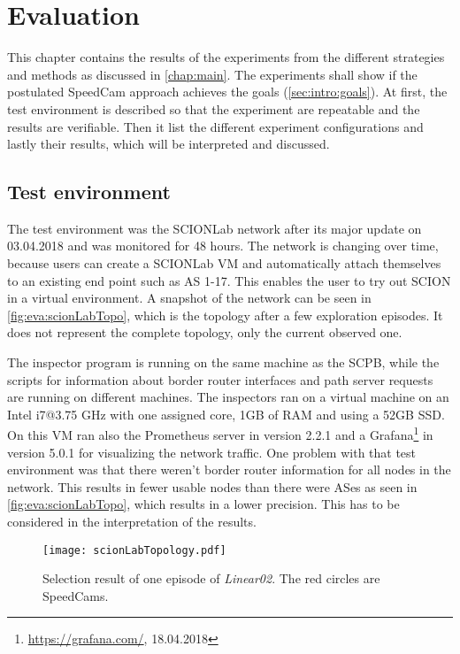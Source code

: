 \documentclass[thesis.tex]{subfiles}
\begin{document}
\chapter{Evaluation}\label{chap:eva}

This chapter contains the results of the experiments from the different strategies and methods as discussed in \autoref{chap:main}. The experiments shall show if the postulated SpeedCam approach achieves the goals (\autoref{sec:intro:goals}). At first, the test environment is described so that the experiment are repeatable and the results are verifiable. Then it list the different experiment configurations and lastly their results, which will be interpreted and discussed.

\section{Test environment}
The test environment was the SCIONLab network after its major update on 03.04.2018 and was monitored for 48 hours. The network is changing over time, because users can create a SCIONLab VM and automatically attach themselves to an existing end point such as AS 1-17. This enables the user to try out SCION in a virtual environment. A snapshot of the network can be seen in \autoref{fig:eva:scionLabTopo}, which is the topology after a few exploration episodes. It does not represent the complete topology, only the current observed one. 

The inspector program is running on the same machine as the SCPB, while the scripts for information about border router interfaces and path server requests are running on different machines. The inspectors ran on a virtual machine on an Intel i7@3.75 GHz with one assigned core, 1GB of RAM and using a 52GB SSD. On this VM ran also the Prometheus server in version 2.2.1 and a Grafana\footnote{{\url{https://grafana.com/}, 18.04.2018}} in version 5.0.1 for visualizing the network traffic. One problem with that test environment was that there weren't border router information for all nodes in the network. This results in fewer usable nodes than there were ASes as seen in \autoref{fig:eva:scionLabTopo}, which results in a lower precision. This has to be considered in the interpretation of the results.

\begin{figure}
	\centering
	\texttt{[image: scionLabTopology.pdf]}
	\caption{Selection result of one episode of \textit{Linear02}. The red circles are SpeedCams.}
	\label{fig:eva:scionLabTopo}
\end{figure}
\end{document}
